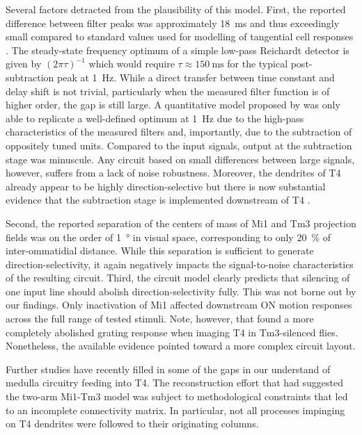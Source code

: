 Several factors detracted from the plausibility of this model. First, the reported difference between filter peaks was approximately \SI{18}{\milli\second} and thus exceedingly small compared to standard values used for modelling of tangential cell responses \citep{Behnia:2014jh}. The steady-state frequency optimum of a simple low-pass Reichardt detector is given by $(2 \pi \tau)^{-1}$ which would require $\tau \approx \SI{150}{\milli\second}$ for the typical post-subtraction peak at \SI{1}{\hertz}. While a direct transfer between time constant and delay shift is not trivial, particularly when the measured filter function is of higher order, the gap is still large. A quantitative model proposed by \citet{Behnia:2014jh} was only able to replicate a well-defined optimum at \SI{1}{\hertz} due to the high-pass characteristics of the measured filters and, importantly, due to the subtraction of oppositely tuned units. Compared to the input signals, output at the subtraction stage was minuscule. Any circuit based on small differences between large signals, however, suffers from a lack of noise robustness. Moreover, the dendrites of T4 already appear to be highly direction-selective but there is now substantial evidence that the subtraction stage is implemented downstream of T4 \citep[see][and the sections below]{Mauss:2015kj}.

Second, the reported separation of the centers of mass of Mi1 and Tm3 projection fields was on the order of \SI{1}{\degree} in visual space, corresponding to only \SI{20}{\percent} of inter-ommatidial distance. While this separation is sufficient to generate direction-selectivity, it again negatively impacts the signal-to-noise characteristics of the resulting circuit. Third, the circuit model clearly predicts that silencing of one input line should abolish direction-selectivity fully. This was not borne out by our findings. Only inactivation of Mi1 affected downstream ON motion responses across the full range of tested stimuli. Note, however, that \citet{Strother:2017aa} found a more completely abolished grating response when imaging T4 in Tm3-silenced flies. Nonetheless, the available evidence pointed toward a more complex circuit layout.

Further studies have recently filled in some of the gaps in our understand of medulla circuitry feeding into T4. The reconstruction effort that had suggested the two-arm Mi1-Tm3 model was subject to methodological constraints that led to an incomplete connectivity matrix. In particular, not all processes impinging on T4 dendrites were followed to their originating columns.

